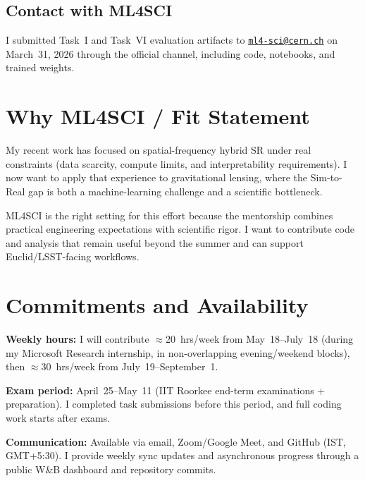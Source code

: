 \documentclass[11pt,a4paper]{article}
\begin{document}
\subsection{Contact with ML4SCI}

I submitted Task~I and Task~VI evaluation artifacts to \href{mailto:ml4-sci@cern.ch}{\texttt{ml4-sci@cern.ch}} on March~31, 2026 through the official channel, including code, notebooks, and trained weights.

\vspace{6pt}

\section{Why ML4SCI / Fit Statement}

My recent work has focused on spatial-frequency hybrid SR under real constraints (data scarcity, compute limits, and interpretability requirements). I now want to apply that experience to gravitational lensing, where the Sim-to-Real gap is both a machine-learning challenge and a scientific bottleneck.

ML4SCI is the right setting for this effort because the mentorship combines practical engineering expectations with scientific rigor. I want to contribute code and analysis that remain useful beyond the summer and can support Euclid/LSST-facing workflows.

\vspace{6pt}

\section{Commitments and Availability}

\textbf{Weekly hours:} I will contribute $\approx$20~hrs/week from May~18--July~18 (during my Microsoft Research internship, in non-overlapping evening/weekend blocks), then $\approx$30~hrs/week from July~19--September~1.

\textbf{Exam period:} April~25--May~11 (IIT Roorkee end-term examinations + preparation). I completed task submissions before this period, and full coding work starts after exams.

\textbf{Communication:} Available via email, Zoom/Google Meet, and GitHub (IST, GMT+5:30). I provide weekly sync updates and asynchronous progress through a public W\&B dashboard and repository commits.
\end{document}
